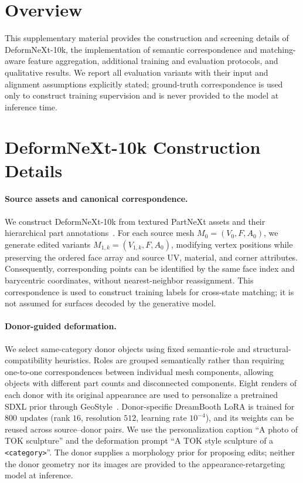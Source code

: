 \clearpage
\setcounter{page}{1}
\renewcommand{\thepage}{S\arabic{page}}
\maketitlesupplementary


\begin{appendix}

\section*{Overview}

This supplementary material provides the construction and screening details of
DeformNeXt-10k, the implementation of semantic correspondence and
matching-aware feature aggregation, additional training and evaluation
protocols, and qualitative results.  We report all evaluation variants with
their input and alignment assumptions explicitly stated; ground-truth
correspondence is used only to construct training supervision and is never
provided to the model at inference time.


\section{DeformNeXt-10k Construction Details}
\label{sec:supp_deformnext}

\paragraph{Source assets and canonical correspondence.}
We construct DeformNeXt-10k from textured PartNeXt assets and their hierarchical part annotations~\cite{wang2026partnext}.
For each source mesh $M_0=(V_0,F,A_0)$, we generate edited variants $M_{1,k}=(V_{1,k},F,A_0)$, modifying vertex positions while preserving the ordered face array and source UV, material, and corner attributes.
Consequently, corresponding points can be identified by the same face index and barycentric coordinates, without nearest-neighbor reassignment.
This correspondence is used to construct training labels for cross-state matching; it is not assumed for surfaces decoded by the generative model.

\paragraph{Donor-guided deformation.}
We select same-category donor objects using fixed semantic-role and structural-compatibility heuristics.
Roles are grouped semantically rather than requiring one-to-one correspondences between individual mesh components, allowing objects with different part counts and disconnected components.
Eight renders of each donor with its original appearance are used to personalize a pretrained SDXL prior through GeoStyle~\cite{choi2026image}.
Donor-specific DreamBooth LoRA is trained for $800$ updates (rank $16$, resolution $512$, learning rate $10^{-4}$), and its weights can be reused across source--donor pairs.
We use the personalization caption ``A photo of TOK sculpture'' and the deformation prompt ``A TOK style sculpture of a \texttt{<category>}''.
The donor supplies a morphology prior for proposing edits; neither the donor geometry nor its images are provided to the appearance-retargeting model at inference.


\end{appendix}
